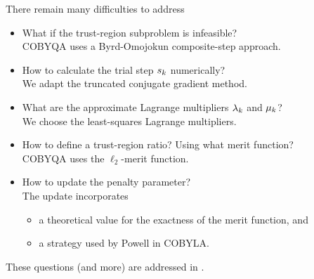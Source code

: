 \documentclass[
]{talk}
\newcommand*{\lmeq}[1][]{\mu\ifblank{#1}{}{_{#1}}}
\newcommand*{\lmub}[1][]{\lambda\ifblank{#1}{}{_{#1}}}
\newcommand*{\step}[1][]{s\ifblank{#1}{}{_{#1}}}
\begin{document}
\begin{frame}{There remain many difficulties to address}
    \begin{itemize}
        \setlength\itemsep{0.5em}
        \item What if the trust-region subproblem is \alert{infeasible}?\\
        \textcolor{FernGreen}{COBYQA uses a Byrd-Omojokun composite-step approach.}
        \item How to calculate the trial step $\step[k]$ \alert{numerically}?\\
        \textcolor{FernGreen}{We adapt the truncated conjugate gradient method.}
        \item What are the approximate Lagrange multipliers $\lmub[k]$ and $\lmeq[k]$?\\
        \textcolor{FernGreen}{We choose the least-squares Lagrange multipliers.}
        \item How to define a trust-region ratio? Using what \alert{merit} function?\\
        \textcolor{FernGreen}{COBYQA uses the $\ell_2$-merit function.}
        \item How to update the \alert{penalty} parameter?\\
        \textcolor{FernGreen}{The update incorporates}
        \begin{itemize}
            \item \textcolor{FernGreen}{a theoretical value for the exactness of the merit function, and}
            \item \textcolor{FernGreen}{a strategy used by Powell in COBYLA.}
        \end{itemize}
    \end{itemize}

    \medskip

    These questions (and more) are addressed in \textcite{Ragonneau_2022}.
\end{frame}
\end{document}
